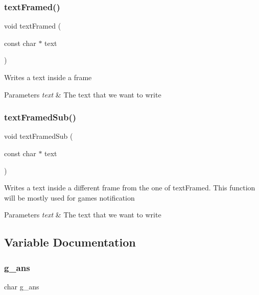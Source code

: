 \subsubsection{\texorpdfstring{text\+Framed()}{textFramed()}}
{\footnotesize\ttfamily void text\+Framed (\begin{DoxyParamCaption}\item[{const char $\ast$}]{text }\end{DoxyParamCaption})}

Writes a text inside a frame 
\begin{DoxyParams}{Parameters}
{\em text} & The text that we want to write \\
\hline
\end{DoxyParams}
\mbox{\label{group__system_gaa2cdcb51e7e5ba8b7e2162e2966e39ab}} 
\subsubsection{\texorpdfstring{text\+Framed\+Sub()}{textFramedSub()}}
{\footnotesize\ttfamily void text\+Framed\+Sub (\begin{DoxyParamCaption}\item[{const char $\ast$}]{text }\end{DoxyParamCaption})}

Writes a text inside a different frame from the one of text\+Framed. This function will be mostly used for game\textquotesingle{}s notification 
\begin{DoxyParams}{Parameters}
{\em text} & The text that we want to write \\
\hline
\end{DoxyParams}


\subsection{Variable Documentation}
\mbox{\label{group__system_gaf046b2323d4aa2925386328d45029271}} 
\subsubsection{\texorpdfstring{g\+\_\+ans}{g\_ans}}
{\footnotesize\ttfamily char g\+\_\+ans}

